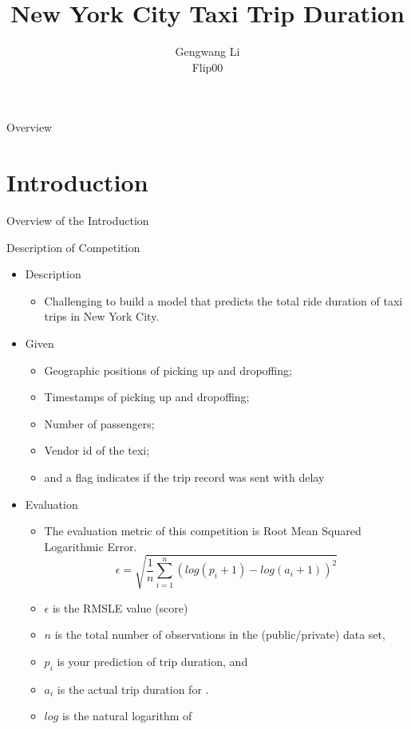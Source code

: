 \documentclass[
 size=12pt,
 paper=smartboard, %
 mode=present, %
 display=slides, %
style=tuliplab,
pauseslide,
fleqn,leqno]{powerdot}
\title{New York City Taxi Trip Duration}
\author{
Gengwang Li
\\
Flip00
}
\date{\gitCommitterDate}
\begin{document}
\maketitle 

\begin{slide}[toc=,bm=]{Overview}
\tableofcontents[content=sections]
\end{slide}


\section{Introduction}

\begin{slide}[toc=,bm=]{Overview of the Introduction}
\tableofcontents[content=currentsection,type=0]
\end{slide}

\begin{slide}{Description of Competition}
  \begin{itemize}
    \item Description \pause
    \begin{itemize}
      \item Challenging to build a model that predicts the total ride duration of taxi trips in New York City.
    \end{itemize} \pause
    \item Given \pause
    \begin{itemize}
      \item Geographic positions of picking up and dropoffing;
      \item Timestamps of picking up and dropoffing;
      \item Number of passengers;
      \item Vendor id of the texi;
      \item and a flag indicates if the trip record was sent with delay
    \end{itemize} \pause
    \item Evaluation \pause
    \begin{itemize}
      \item The evaluation metric of this competition is Root Mean Squared Logarithmic Error.
      $$
      \epsilon = \sqrt{\frac{1}{n} \sum_{i=1}^{n}{(log(p_i + 1) - log(a_i + 1))^2}}
      $$ 
      \pause
      \item $\epsilon$ is the RMSLE value (score)
      \item $n$ is the total number of observations in the (public/private) data set,
      \item $p_i$ is your prediction of trip duration, and
      \item $a_i$ is the actual trip duration for . 
      \item $log$ is the natural logarithm of 
    \end{itemize} 
  \end{itemize}
\end{slide}
\end{document}
